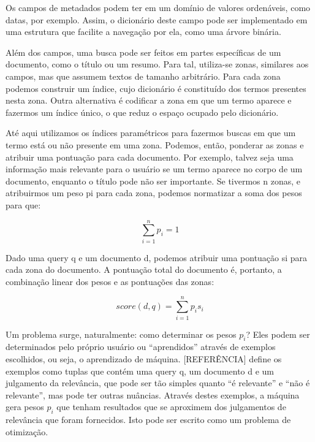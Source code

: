 Os campos de metadados podem ter em um domínio de valores ordenáveis, como datas, por exemplo. Assim, o dicionário deste campo pode ser implementado em uma estrutura que facilite a navegação por ela, como uma árvore binária.

Além dos campos, uma busca pode ser feitos em partes específicas de um documento, como o título ou um resumo. Para tal, utiliza-se zonas, similares aos campos, mas que assumem textos de tamanho arbitrário. Para cada zona podemos construir um índice, cujo dicionário é constituído dos termos presentes nesta zona. Outra alternativa é codificar a zona em que um termo aparece e fazermos um índice único, o que reduz o espaço ocupado pelo dicionário.

Até aqui utilizamos os índices paramétricos para fazermos buscas em que um termo está ou não presente em uma zona. Podemos, então, ponderar as zonas e atribuir uma pontuação para cada documento. Por exemplo, talvez seja uma informação mais relevante para o usuário se um termo aparece no corpo de um documento, enquanto o título pode não ser importante. Se tivermos n zonas, e atribuirmos um peso pi para cada zona, podemos normatizar a soma dos pesos para que:

\begin{displaymath}
	\sum_{i=1}^{n} p_{i} = 1
\end{displaymath}

Dado uma query q e um documento d, podemos atribuir uma pontuação si para cada zona do documento. A pontuação total do documento é, portanto, a combinação linear dos pesos e as pontuações das zonas:

\begin{displaymath}
	score(d,q)= \sum_{i=1}^{n} p_{i} s_{i}
\end{displaymath}

Um problema surge, naturalmente: como determinar os pesos $p_{i}$? Eles podem ser determinados pelo próprio usuário ou “aprendidos” através de exemplos escolhidos, ou seja, o aprendizado de máquina. [REFERÊNCIA] define os exemplos como tuplas que contém uma query q, um documento d e um julgamento da relevância, que pode ser tão simples quanto “é relevante” e “não é relevante”, mas pode ter outras nuâncias. Através destes exemplos, a máquina gera pesos $p_{i}$ que tenham resultados que se aproximem dos julgamentos de relevância que foram fornecidos. Isto pode ser escrito como um problema de otimização.
